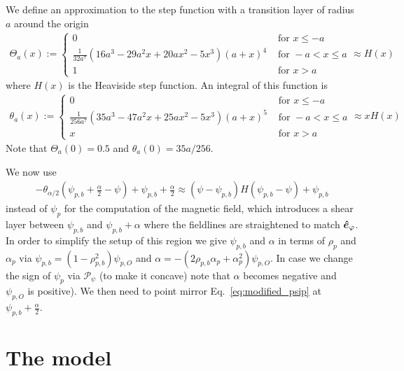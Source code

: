 We define an approximation to the step function with a transition layer of radius $a$
around the origin
\begin{align}
\Theta_a(x) := \begin{cases}
    0 & \text{ for } x \leq -a  \\
    \frac{1}{32 a^7}  \left(16 a^3-29 a^2 x+20 a x^2-5 x^3\right) (a+x)^4
    &\text{ for } -a<x\leq a \\
    1 & \text{ for } x > a
\end{cases}
    \approx H(x)
\label{eq:approx_heaviside}
\end{align}
where $H(x)$ is the Heaviside step function.
An integral of this function is
\begin{align}
\theta_a(x) := \begin{cases}
    0 &\text{ for } x \leq -a \\
    \frac{1}{256 a^7} \left(35 a^3-47 a^2 x+25 a x^2-5 x^3\right) (a+x)^5
     &\text{ for } -a<x\leq a \\
x &\text{ for } x > a
\end{cases}
    \approx x H(x)
\end{align}
Note that $\Theta_a(0) = 0.5$ and $\theta_a(0) = 35a/256$.

We now use
\begin{align}
    -\theta_{\alpha/2}\left(\psi_{p,b} + \frac{\alpha}{2} - \psi \right)+\psi_{p,b}+\frac{\alpha}{2} \approx (\psi- \psi_{p,b})H(\psi_{p,b}-\psi) + \psi_{p,b}
\label{eq:modified_psip}
\end{align}
instead of $\psi_p$ for the computation of the
magnetic field, which introduces a shear layer between $\psi_{p,b}$ and $\psi_{p,b}+\alpha$ where the
fieldlines are straightened to match $\bm{\hat{e}}_\varphi$.
In order to simplify the setup of this region we give $\psi_{p,b}$ and $\alpha$ in terms of
$\rho_p$ and $\alpha_p$ via $\psi_{p,b} = (1-\rho_{p,b}^2)\psi_{p,O}$ and $\alpha = -(2\rho_{p,b} \alpha_p + \alpha_p^2)\psi_{p,O}$. In case we change the sign
of $\psi_p$ via $\mathcal P_\psi$ (to make it concave) note that $\alpha$ becomes
negative and $\psi_{p,O}$ is positive).
We then need to point mirror Eq.~\eqref{eq:modified_psip} at $\psi_{p,b}+\frac{\alpha}{2}$.


\section{The model} \label{sec:model}
